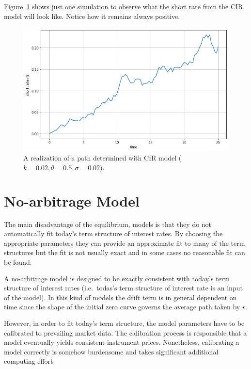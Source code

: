 Figure~\ref{fig:cir_path} shows just one simulation to observe what the short rate from the CIR model will look like. 
Notice how it remains always positive.

\begin{figure}[htb]
	\centering
	\includegraphics[width=0.7\linewidth]{figures/cir_short_rate}
	\caption{A realization of a path determined with CIR model ($k=0.02, \theta=0.5, \sigma=0.02$).}
	\label{fig:cir_path}
\end{figure}


\section{No-arbitrage Model}
\label{no-arbitrage-model}

The main disadvantage of the equilibrium, models is that they do not
automatically fit today's term structure of interest rates. By choosing
the appropriate parameters they can provide an approximate fit to many
of the term structures but the fit is not usually exact and in some
cases no reasonable fit can be found.

A no-arbitrage model is designed to be exactly consistent with today's
term structure of interest rates (i.e.~todas's term structure of
interest rate is an input of the model). In this kind of models the
drift term is in general dependent on time since the shape of the
initial zero curve governs the average path taken by \(r\).

However, in order to fit today’s term structure, the model parameters have
to be calibrated to prevailing market data. The calibration process is 
responsible that a model eventually yields consistent
instrument prices. Nonetheless, calibrating a model correctly is somehow
burdensome and takes significant additional computing effort.

